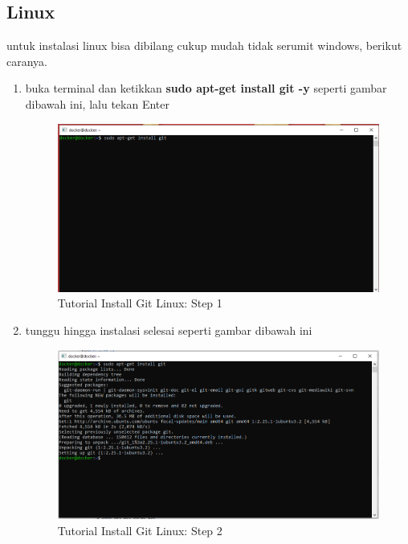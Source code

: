 \subsection{Linux}
untuk instalasi linux bisa dibilang cukup mudah tidak serumit windows, berikut caranya.
\begin{enumerate}
\item buka terminal dan ketikkan \textbf{sudo apt-get install git -y} seperti gambar dibawah ini, lalu tekan Enter
\begin{figure}[H]
        \centerline{\includegraphics[scale=0.5]{figures/instalasi-git-linux/step1}}
        \caption{Tutorial Install Git Linux: Step 1}
\end{figure}
\item tunggu hingga instalasi selesai seperti gambar dibawah ini
\begin{figure}[H]
        \centerline{\includegraphics[scale=0.5]{figures/instalasi-git-linux/step2}}
        \caption{Tutorial Install Git Linux: Step 2}
\end{figure}
\end{enumerate}


